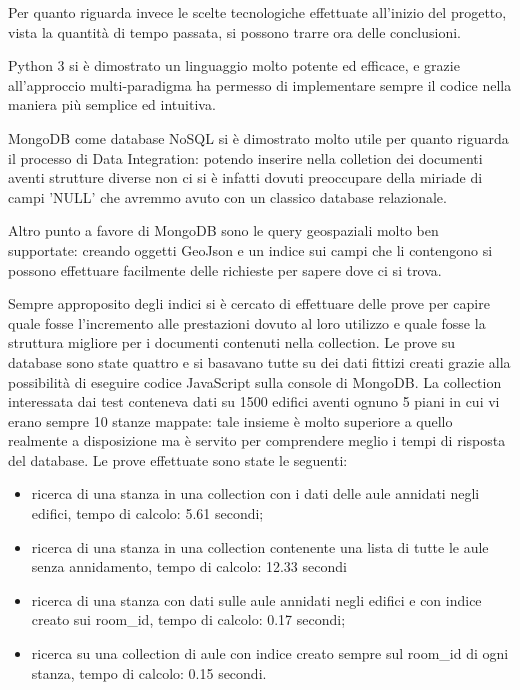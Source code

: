 \documentclass[12pt]{report}
\begin{document}
\vspace{5mm} %

Per quanto riguarda invece le scelte tecnologiche effettuate all'inizio del progetto, vista la quantità di tempo passata, si possono trarre ora delle conclusioni.

Python 3 si è dimostrato un linguaggio molto potente ed efficace, e grazie all'approccio multi-paradigma ha permesso di implementare sempre il codice nella maniera più semplice ed intuitiva.

\vspace{5mm} %

MongoDB come database NoSQL si è dimostrato molto utile per quanto riguarda il processo di Data Integration: potendo inserire nella colletion dei documenti aventi strutture diverse non ci si è infatti dovuti preoccupare della miriade di campi 'NULL' che avremmo avuto con un classico database relazionale.

Altro punto a favore di MongoDB sono le query geospaziali molto ben supportate: creando oggetti GeoJson e un indice sui campi che li contengono si possono effettuare facilmente delle richieste per sapere dove ci si trova.

Sempre approposito degli indici si è cercato di effettuare delle prove per capire quale fosse l'incremento alle prestazioni dovuto al loro utilizzo e quale fosse la struttura migliore per i documenti contenuti nella collection. Le prove su database sono state quattro e si basavano tutte su dei dati fittizi creati grazie alla possibilità di eseguire codice JavaScript sulla console di MongoDB. 
La collection interessata dai test conteneva dati su 1500 edifici aventi ognuno 5 piani in cui vi erano sempre 10 stanze mappate: tale insieme è molto superiore a quello realmente a disposizione ma è servito per comprendere meglio i tempi di risposta del database.   
Le prove effettuate sono state le seguenti:
\begin{itemize}
\item ricerca di una stanza in una collection con i dati delle aule annidati negli edifici, tempo di calcolo: 5.61 secondi;
\item ricerca di una stanza in una collection contenente una lista di tutte le aule senza annidamento, tempo di calcolo: 12.33 secondi
\item ricerca di una stanza con dati sulle aule annidati negli edifici e con indice creato sui room\_id, tempo di calcolo: 0.17 secondi;
\item ricerca su una collection di aule con indice creato sempre sul room\_id di ogni stanza, tempo di calcolo: 0.15 secondi. 
\end{itemize}
\end{document}
